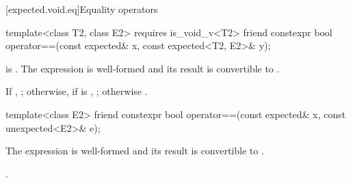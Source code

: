 [expected.void.eq]{Equality operators}

%
\begin{itemdecl}
template<class T2, class E2>
  requires is_void_v<T2>
friend constexpr bool operator==(const expected& x, const expected<T2, E2>& y);
\end{itemdecl}

\begin{itemdescr}
\pnum
\mandates
{} is . The expression  is well-formed and its result is convertible to .

\pnum
\returns
If , ; otherwise, if  is , ; otherwise .
\end{itemdescr}

%
\begin{itemdecl}
template<class E2>
friend constexpr bool operator==(const expected& x, const unexpected<E2>& e);
\end{itemdecl}

\begin{itemdescr}
\pnum
\mandates
The expression  is well-formed and its result is convertible to .

\pnum
\returns
{}.
\end{itemdescr}
